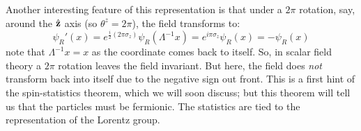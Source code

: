 Another interesting feature of this representation is that under a $2\pi$ rotation, say, around the $\hat{\mathbf{z}}$ axis (so $\theta^z = 2\pi$), the field transforms to:
\begin{equation}
    \psi_R'(x) = e^{\frac{i}{2}(2\pi \sigma_z)}\psi_R(\Lambda^{-1}x) = e^{i\pi \sigma_z}\psi_R(x) = -\psi_R(x)
\end{equation}
note that $\Lambda^{-1}x = x$ as the coordinate comes back to itself. So, in scalar field theory a $2\pi$ rotation leaves the field invariant. But here, the field does \emph{not} transform back into itself due to the negative sign out front. This is a first hint of the spin-statistics theorem, which we will soon discuss; but this theorem will tell us that the particles must be fermionic. The statistics are tied to the representation of the Lorentz group.

